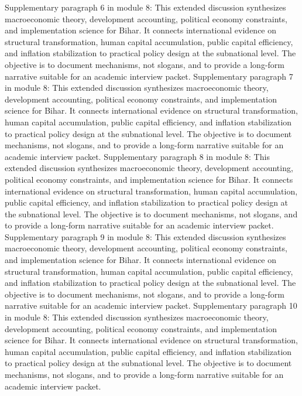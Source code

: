 \documentclass[preprint,12pt]{elsarticle}
\begin{document}
Supplementary paragraph 6 in module 8: This extended discussion synthesizes macroeconomic theory, development accounting, political economy constraints, and implementation science for Bihar. It connects international evidence on structural transformation, human capital accumulation, public capital efficiency, and inflation stabilization to practical policy design at the subnational level. The objective is to document mechanisms, not slogans, and to provide a long-form narrative suitable for an academic interview packet.
Supplementary paragraph 7 in module 8: This extended discussion synthesizes macroeconomic theory, development accounting, political economy constraints, and implementation science for Bihar. It connects international evidence on structural transformation, human capital accumulation, public capital efficiency, and inflation stabilization to practical policy design at the subnational level. The objective is to document mechanisms, not slogans, and to provide a long-form narrative suitable for an academic interview packet.
Supplementary paragraph 8 in module 8: This extended discussion synthesizes macroeconomic theory, development accounting, political economy constraints, and implementation science for Bihar. It connects international evidence on structural transformation, human capital accumulation, public capital efficiency, and inflation stabilization to practical policy design at the subnational level. The objective is to document mechanisms, not slogans, and to provide a long-form narrative suitable for an academic interview packet.
Supplementary paragraph 9 in module 8: This extended discussion synthesizes macroeconomic theory, development accounting, political economy constraints, and implementation science for Bihar. It connects international evidence on structural transformation, human capital accumulation, public capital efficiency, and inflation stabilization to practical policy design at the subnational level. The objective is to document mechanisms, not slogans, and to provide a long-form narrative suitable for an academic interview packet.
Supplementary paragraph 10 in module 8: This extended discussion synthesizes macroeconomic theory, development accounting, political economy constraints, and implementation science for Bihar. It connects international evidence on structural transformation, human capital accumulation, public capital efficiency, and inflation stabilization to practical policy design at the subnational level. The objective is to document mechanisms, not slogans, and to provide a long-form narrative suitable for an academic interview packet.
\end{document}
